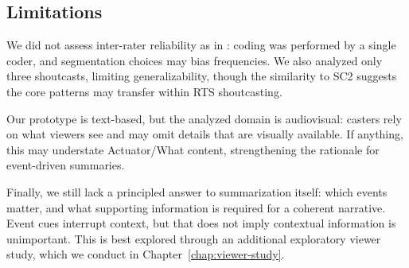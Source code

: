 \subsection{Limitations}
We did not assess inter-rater reliability as in \citet{dodge2018}: coding was performed by a single coder, and segmentation choices may bias frequencies. We also analyzed only three shoutcasts, limiting generalizability, though the similarity to SC2 suggests the core patterns may transfer within RTS shoutcasting.

Our prototype is text-based, but the analyzed domain is audiovisual: casters rely on what viewers see and may omit details that are visually available. If anything, this may understate Actuator/What content, strengthening the rationale for event-driven summaries.

Finally, we still lack a principled answer to summarization itself: which events matter, and what supporting information is required for a coherent narrative. Event cues interrupt context, but that does not imply contextual information is unimportant. This is best explored through an additional exploratory viewer study, which we conduct in Chapter~\ref{chap:viewer-study}.
